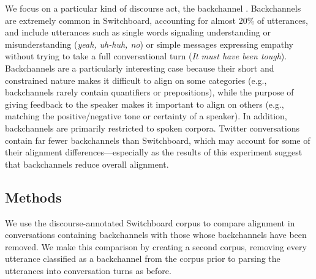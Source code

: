 \documentclass[11pt]{article}
\begin{document}
We focus on a particular kind of discourse act, the backchannel \cite{Yngve1970}. Backchannels are extremely common in Switchboard, accounting for almost 20\% of utterances, and include utterances such as single words signaling understanding or misunderstanding (\textit{yeah, uh-huh, no}) or simple messages expressing empathy without trying to take a full conversational turn (\textit{It must have been tough}).  Backchannels are a particularly interesting case because their short and constrained nature makes it difficult to align on some categories (e.g., backchannels rarely contain quantifiers or prepositions), while the purpose of giving feedback to the speaker makes it important to align on others (e.g., matching the positive/negative tone or certainty of a speaker).  In addition, backchannels are primarily restricted to spoken corpora. Twitter conversations contain far fewer backchannels than Switchboard, which may account for some of their alignment differences---especially as the results of this experiment suggest that backchannels reduce overall alignment.



\subsection{Methods}

We use the discourse-annotated Switchboard corpus to compare alignment in conversations containing backchannels with those whose backchannels have been removed. We make this comparison by creating a second corpus, removing every utterance classified as a backchannel from the corpus prior to parsing the utterances into conversation turns as before.
\end{document}
